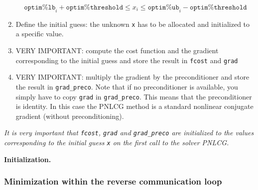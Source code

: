 \documentclass[a4paper,twoside,final,onecolumn,11pt,openright]{article}
\begin{document}
\begin{enumerate}
\begin{equation}
 \texttt{optim\%lb}_i + \texttt{optim\%threshold} \leq x_i \leq \texttt{optim\%ub}_i - \texttt{optim\%threshold}
\end{equation}
\item Define the initial guess: the unknown \texttt{x} has to be allocated and initialized to a specific value. 
\item VERY IMPORTANT: compute the cost function and the gradient corresponding to the initial guess and store the result in \texttt{fcost} and \texttt{grad}
\item VERY IMPORTANT: multiply the gradient by the preconditioner and store the result in \texttt{grad\_preco}. Note that if no preconditioner is available, you simply have to copy \texttt{grad} in \texttt{grad\_preco}. This means that the preconditioner is identity. In this case the PNLCG method is a standard nonlinear conjugate gradient (without preconditioning). 
\end{enumerate}
\textit{It is very important that \texttt{fcost}, \texttt{grad} and \texttt{grad\_preco} are initialized to the values corresponding to the initial guess \texttt{x} on the first call to the solver PNLCG.}

\framebox{
\small
 
}
\normalsize
\begin{center}
\textbf{Initialization.} 
\end{center}

\subsubsection{Minimization within the reverse communication loop}
\end{document}
